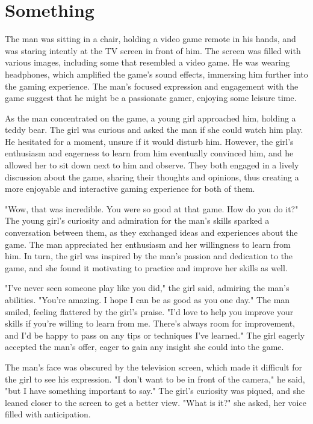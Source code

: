 \documentclass[smalldemyvopaper,11pt,twoside,onecolumn,openright,extrafontsizes]{memoir}
\begin{document}
\chapter{Something}
The man was sitting in a chair, holding a video game remote in his hands, and was staring intently at the TV screen in front of him. The screen was filled with various images, including some that resembled a video game. He was wearing headphones, which amplified the game's sound effects, immersing him further into the gaming experience. The man's focused expression and engagement with the game suggest that he might be a passionate gamer, enjoying some leisure time.\par
As the man concentrated on the game, a young girl approached him, holding a teddy bear. The girl was curious and asked the man if she could watch him play. He hesitated for a moment, unsure if it would disturb him. However, the girl's enthusiasm and eagerness to learn from him eventually convinced him, and he allowed her to sit down next to him and observe. They both engaged in a lively discussion about the game, sharing their thoughts and opinions, thus creating a more enjoyable and interactive gaming experience for both of them.\par
"Wow, that was incredible. You were so good at that game. How do you do it?" The young girl's curiosity and admiration for the man's skills sparked a conversation between them, as they exchanged ideas and experiences about the game. The man appreciated her enthusiasm and her willingness to learn from him. In turn, the girl was inspired by the man's passion and dedication to the game, and she found it motivating to practice and improve her skills as well.\par
"I've never seen someone play like you did," the girl said, admiring the man's abilities. "You're amazing. I hope I can be as good as you one day." The man smiled, feeling flattered by the girl's praise. "I'd love to help you improve your skills if you're willing to learn from me. There's always room for improvement, and I'd be happy to pass on any tips or techniques I've learned." The girl eagerly accepted the man's offer, eager to gain any insight she could into the game.\par
The man's face was obscured by the television screen, which made it difficult for the girl to see his expression. "I don't want to be in front of the camera," he said, "but I have something important to say." The girl's curiosity was piqued, and she leaned closer to the screen to get a better view. "What is it?" she asked, her voice filled with anticipation.\par
\end{document}
